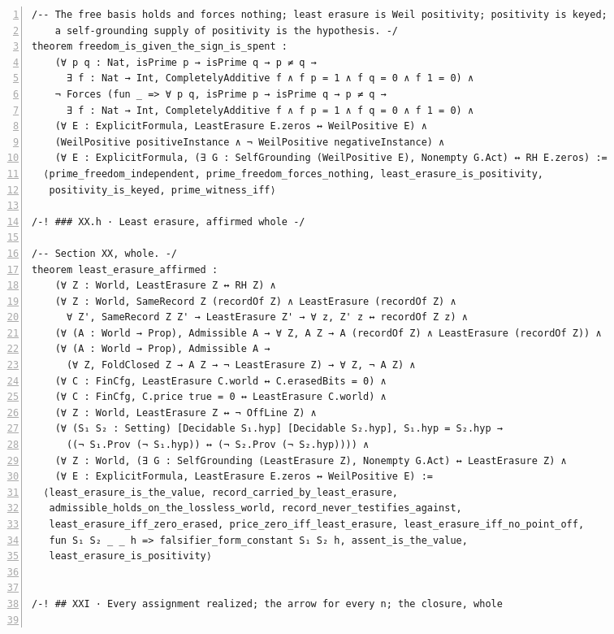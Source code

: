 \documentclass[10pt]{article}
\newcommand{\leansize}{\fontsize{5.5pt}{6.75pt}\selectfont}
\begin{document}
\begin{multicols}{2}
\begin{Verbatim}[numbers=left,firstnumber=1,numbersep=3pt,xleftmargin=2.6em,breaklines=true,breakanywhere=true,breakautoindent=false,breakindent=1.4em,breaksymbolleft={},breakanywheresymbolpre={},fontsize=\leansize]
/-- The free basis holds and forces nothing; least erasure is Weil positivity; positivity is keyed;
    a self-grounding supply of positivity is the hypothesis. -/
theorem freedom_is_given_the_sign_is_spent :
    (∀ p q : Nat, isPrime p → isPrime q → p ≠ q →
      ∃ f : Nat → Int, CompletelyAdditive f ∧ f p = 1 ∧ f q = 0 ∧ f 1 = 0) ∧
    ¬ Forces (fun _ => ∀ p q, isPrime p → isPrime q → p ≠ q →
      ∃ f : Nat → Int, CompletelyAdditive f ∧ f p = 1 ∧ f q = 0 ∧ f 1 = 0) ∧
    (∀ E : ExplicitFormula, LeastErasure E.zeros ↔ WeilPositive E) ∧
    (WeilPositive positiveInstance ∧ ¬ WeilPositive negativeInstance) ∧
    (∀ E : ExplicitFormula, (∃ G : SelfGrounding (WeilPositive E), Nonempty G.Act) ↔ RH E.zeros) :=
  ⟨prime_freedom_independent, prime_freedom_forces_nothing, least_erasure_is_positivity,
   positivity_is_keyed, prime_witness_iff⟩

/-! ### XX.h · Least erasure, affirmed whole -/

/-- Section XX, whole. -/
theorem least_erasure_affirmed :
    (∀ Z : World, LeastErasure Z ↔ RH Z) ∧
    (∀ Z : World, SameRecord Z (recordOf Z) ∧ LeastErasure (recordOf Z) ∧
      ∀ Z', SameRecord Z Z' → LeastErasure Z' → ∀ z, Z' z ↔ recordOf Z z) ∧
    (∀ (A : World → Prop), Admissible A → ∀ Z, A Z → A (recordOf Z) ∧ LeastErasure (recordOf Z)) ∧
    (∀ (A : World → Prop), Admissible A →
      (∀ Z, FoldClosed Z → A Z → ¬ LeastErasure Z) → ∀ Z, ¬ A Z) ∧
    (∀ C : FinCfg, LeastErasure C.world ↔ C.erasedBits = 0) ∧
    (∀ C : FinCfg, C.price true = 0 ↔ LeastErasure C.world) ∧
    (∀ Z : World, LeastErasure Z ↔ ¬ OffLine Z) ∧
    (∀ (S₁ S₂ : Setting) [Decidable S₁.hyp] [Decidable S₂.hyp], S₁.hyp = S₂.hyp →
      ((¬ S₁.Prov (¬ S₁.hyp)) ↔ (¬ S₂.Prov (¬ S₂.hyp)))) ∧
    (∀ Z : World, (∃ G : SelfGrounding (LeastErasure Z), Nonempty G.Act) ↔ LeastErasure Z) ∧
    (∀ E : ExplicitFormula, LeastErasure E.zeros ↔ WeilPositive E) :=
  ⟨least_erasure_is_the_value, record_carried_by_least_erasure,
   admissible_holds_on_the_lossless_world, record_never_testifies_against,
   least_erasure_iff_zero_erased, price_zero_iff_least_erasure, least_erasure_iff_no_point_off,
   fun S₁ S₂ _ _ h => falsifier_form_constant S₁ S₂ h, assent_is_the_value,
   least_erasure_is_positivity⟩


/-! ## XXI · Every assignment realized; the arrow for every n; the closure, whole


\end{Verbatim}
\end{multicols}
\end{document}
